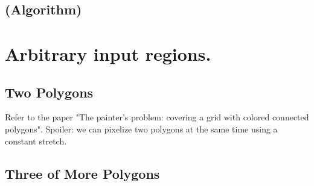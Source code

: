 \documentclass[a4paper, UKenglish]{lipics-v2018}
\begin{document}

\subsection{(Algorithm)}
\label{sub:convex_algo}






\section{Arbitrary input regions.}
\label{sec:arbitrary}

\subsection{Two Polygons}

Refer to the paper "The painter’s problem: covering a grid with colored connected polygons".
Spoiler: we can pixelize two polygons at the same time using a constant stretch.

\subsection{Three of More Polygons}
\end{document}

